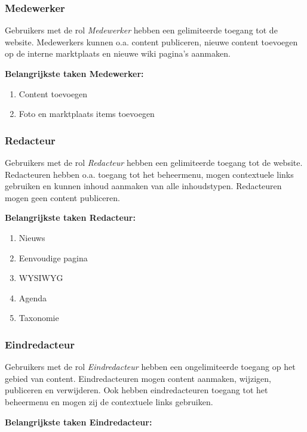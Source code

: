 \subsubsection{Medewerker}\label{medewerker}
Gebruikers met de rol \emph{Medewerker} hebben een gelimiteerde toegang tot de website. Medewerkers kunnen o.a. content publiceren, nieuwe content toevoegen op de interne marktplaats en nieuwe wiki pagina's aanmaken.

\textbf{Belangrijkste taken Medewerker:}

\begin{enumerate}
\item Content toevoegen
\item Foto en marktplaats  items toevoegen
\end{enumerate}

\subsubsection{Redacteur}\label{redacteur}
Gebruikers met de rol \emph{Redacteur} hebben een gelimiteerde toegang tot de website. Redacteuren hebben o.a. toegang tot het beheermenu, mogen contextuele links gebruiken en kunnen inhoud aanmaken van alle inhoudstypen. Redacteuren mogen geen content publiceren.

\textbf{Belangrijkste taken Redacteur:}

\begin{enumerate}
\item Nieuws 
\item Eenvoudige pagina
\item WYSIWYG 
\item Agenda 
\item Taxonomie 
\end{enumerate}

\subsubsection{Eindredacteur}\label{eindredacteur}
Gebruikers met de rol \emph{Eindredacteur} hebben een ongelimiteerde toegang op het gebied van content. Eindredacteuren mogen content aanmaken, wijzigen, publiceren en verwijderen. Ook hebben eindredacteuren toegang tot het beheermenu en mogen zij de contextuele links gebruiken.

\textbf{Belangrijkste taken Eindredacteur:}

